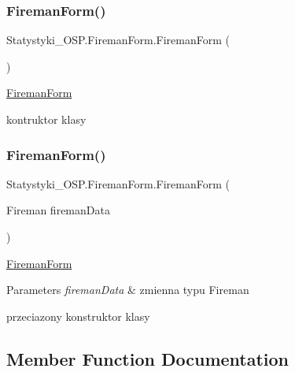 \subsubsection{\texorpdfstring{FiremanForm()}{FiremanForm()}\hspace{0.1cm}{\footnotesize\ttfamily [1/2]}}
{\footnotesize\ttfamily Statystyki\+\_\+\+O\+S\+P.\+Fireman\+Form.\+Fireman\+Form (\begin{DoxyParamCaption}{ }\end{DoxyParamCaption})}



\mbox{\hyperlink{class_statystyki___o_s_p_1_1_fireman_form}{Fireman\+Form}} 

kontruktor klasy\mbox{\label{class_statystyki___o_s_p_1_1_fireman_form_a774be63ea528569c402651d4f8f7a335}} 
\subsubsection{\texorpdfstring{FiremanForm()}{FiremanForm()}\hspace{0.1cm}{\footnotesize\ttfamily [2/2]}}
{\footnotesize\ttfamily Statystyki\+\_\+\+O\+S\+P.\+Fireman\+Form.\+Fireman\+Form (\begin{DoxyParamCaption}\item[{Fireman}]{fireman\+Data }\end{DoxyParamCaption})}



\mbox{\hyperlink{class_statystyki___o_s_p_1_1_fireman_form}{Fireman\+Form}} 


\begin{DoxyParams}{Parameters}
{\em fireman\+Data} & zmienna typu Fireman\\
\hline
\end{DoxyParams}


przeciazony konstruktor klasy

\subsection{Member Function Documentation}
\mbox{\label{class_statystyki___o_s_p_1_1_fireman_form_a651a19a5d290493f52a21df3dbf3fe86}} 
